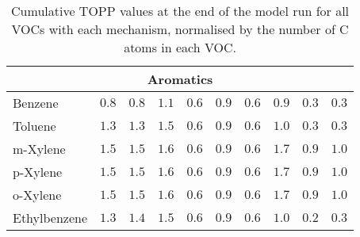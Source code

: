 {\begin{sidewaystable}
\begin{center}
\begin{tabular}{llllllllll}
                \multicolumn{10}{c}{\textbf{Aromatics}} \\ \hline 
                Benzene & $0.8$ & $0.8$ & $1.1$ & $0.6$ & $0.9$ & $0.6$ & $0.9$ & $0.3$ & $0.3$ \\
                Toluene & $1.3$ & $1.3$ & $1.5$ & $0.6$ & $0.9$ & $0.6$ & $1.0$ & $0.3$ & $0.3$ \\
                m-Xylene & $1.5$ & $1.5$ & $1.6$ & $0.6$ & $0.9$ & $0.6$ & $1.7$ & $0.9$ & $1.0$ \\
                p-Xylene & $1.5$ & $1.5$ & $1.6$ & $0.6$ & $0.9$ & $0.6$ & $1.7$ & $0.9$ & $1.0$ \\
                o-Xylene & $1.5$ & $1.5$ & $1.6$ & $0.6$ & $0.9$ & $0.6$ & $1.7$ & $0.9$ & $1.0$ \\
                Ethylbenzene & $1.3$ & $1.4$ & $1.5$ & $0.6$ & $0.9$ & $0.6$ & $1.0$ & $0.2$ & $0.3$ \\
                \hline \hline
            \end{tabular}%
            \caption{Cumulative TOPP values at the end of the model run for all VOCs with each mechanism, normalised by the number of C atoms in each VOC.}%
            \label{t:cumulative_TOPPs_per_C}%
        \end{center}%
    \end{sidewaystable}%
}
